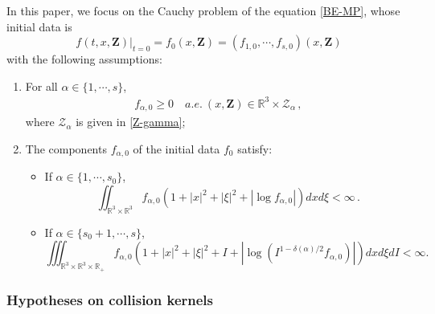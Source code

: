 \documentclass[reqno,11pt]{amsart}
\numberwithin{equation}{section}
\def\R{\mathbb{R}}
\begin{document}
In this paper, we focus on the Cauchy problem of the equation \eqref{BE-MP}, whose initial data is 
\begin{equation}\label{f0}
		f ( t, x, \mathbf{Z} ) |_{t=0} = f_0 (x, \mathbf{Z}) = (f_{1,0},\cdots,f_{s,0}) (x, \mathbf{Z})
\end{equation}
with the following assumptions:
\begin{enumerate}
    \item For all $\alpha \in \{ 1, \cdots, s \}$,
    \begin{equation}\label{f0-p}
        \begin{aligned}
            f_{\alpha, 0} \geq 0 \quad a.e. \ (x, \mathbf{Z}) \in \R^3 \times \mathcal{Z_\alpha} \,,
        \end{aligned}
    \end{equation}
    where $\mathcal{Z_\alpha}$ is given in \eqref{Z-gamma};
    \item The components $f_{\alpha, 0}$ of the initial data $f_0$ satisfy:
    \begin{itemize}
        \item If $\alpha \in \{1,\cdots ,s_0\}$,
        \begin{equation}\label{fs0}
            \iint_{\R^3 \times \R^3} f_{\alpha,0} (1+|x|^2 +|\xi|^2 +|\log f_{\alpha,0}|)dxd\xi <\infty \,.
        \end{equation}
        \item If $\alpha \in \{s_0+1,\cdots ,s\} $,
        \begin{equation}\label{fs}
            \iiint_{\R^3 \times \R^3 \times \R_+} f_{\alpha,0} (1+|x|^2 +|\xi|^2+I +|\log(I^{1-\delta(\alpha)/2} f_{\alpha,0})|)dxd\xi dI<\infty.
    \end{equation}
    \end{itemize}
\end{enumerate}

\subsubsection{Hypotheses on collision kernels}
\end{document}
